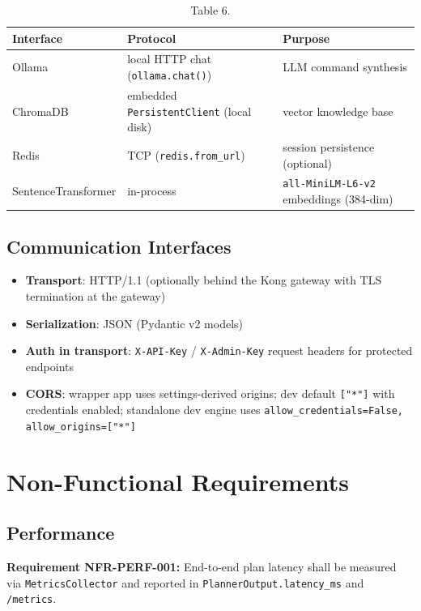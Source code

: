 \documentclass[10pt,journal,onecolumn]{IEEEtran}
\newcommand{\reqid}[1]{\textbf{#1}}
\begin{document}
\begin{table}[h]
\caption{Table 6.}
\label{tab:t6}
\begin{tabularx}{\columnwidth}{l >{\raggedright\arraybackslash}X >{\raggedright\arraybackslash}X}
\toprule
\textbf{Interface} & \textbf{Protocol} & \textbf{Purpose}\\
\midrule
Ollama & local HTTP chat (\texttt{ollama.chat()}) & LLM command synthesis\\
ChromaDB & embedded \texttt{PersistentClient} (local disk) & vector knowledge base\\
Redis & TCP (\texttt{redis.from\_url}) & session persistence (optional)\\
SentenceTransformer & in-process & \texttt{all-MiniLM-L6-v2} embeddings (384-dim)\\
\bottomrule
\end{tabularx}
\end{table}

\subsection{Communication Interfaces}

\begin{itemize}
\item \textbf{Transport}: HTTP/1.1 (optionally behind the Kong gateway with TLS termination at the gateway)
\item \textbf{Serialization}: JSON (Pydantic v2 models)
\item \textbf{Auth in transport}: \texttt{X-API-Key} / \texttt{X-Admin-Key} request headers for protected endpoints
\item \textbf{CORS}: wrapper app uses settings-derived origins; dev default \texttt{["*"]} with credentials enabled; standalone dev engine uses \texttt{allow\_\allowbreak credentials=False, allow\_\allowbreak origins=["*"]}
\end{itemize}

\section{Non-Functional Requirements}

\subsection{Performance}

\reqid{Requirement NFR-PERF-001:} End-to-end plan latency shall be measured via \texttt{MetricsCollector} and reported in \texttt{PlannerOutput.\allowbreak latency\_\allowbreak ms} and \texttt{/metrics}.
\end{document}
